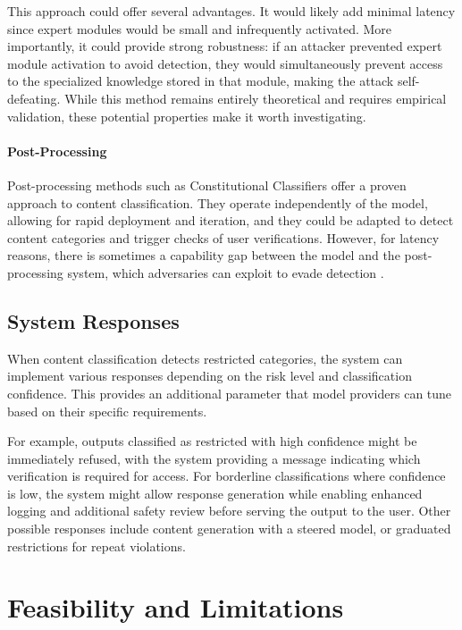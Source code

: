\documentclass{article}
\theoremstyle{plain}
\theoremstyle{definition}
\theoremstyle{remark}
\begin{document}
This approach could offer several advantages.
It would likely add minimal latency since expert modules would be small and infrequently activated.
More importantly, it could provide strong robustness: if an attacker prevented expert module activation to avoid detection, they would simultaneously prevent access to the specialized knowledge stored in that module, making the attack self-defeating.
While this method remains entirely theoretical and requires empirical validation, these potential properties make it worth investigating.

\paragraph{Post-Processing}

Post-processing methods such as Constitutional Classifiers \cite{sharma2025constitutionalclassifiersdefendinguniversal} offer a proven approach to content classification.
They operate independently of the model, allowing for rapid deployment and iteration, and they could be adapted to detect content categories and trigger checks of user verifications.
However, for latency reasons, there is sometimes a capability gap between the model and the post-processing system, which adversaries can exploit to evade detection \cite{jin2024jailbreakinglargelanguagemodels, kumar2025freelunchguardrails}.

\subsection{System Responses} \label{section:system-responses}

When content classification detects restricted categories, the system can implement various responses depending on the risk level and classification confidence.
This provides an additional parameter that model providers can tune based on their specific requirements.

For example, outputs classified as restricted with high confidence might be immediately refused, with the system providing a message indicating which verification is required for access.
For borderline classifications where confidence is low, the system might allow response generation while enabling enhanced logging and additional safety review before serving the output to the user.
Other possible responses include content generation with a steered model, or graduated restrictions for repeat violations.

\section{Feasibility and Limitations}
\label{section:feasibility-and-limitations}
\end{document}
